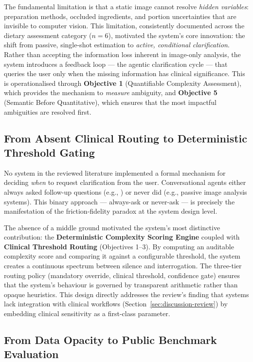 The fundamental limitation is that a static image cannot resolve \emph{hidden variables}: preparation methods, occluded ingredients, and portion uncertainties that are invisible to computer vision. This limitation, consistently documented across the dietary assessment category ($n=6$), motivated the system's core innovation: the shift from passive, single-shot estimation to \emph{active, conditional clarification}. Rather than accepting the information loss inherent in image-only analysis, the system introduces a feedback loop --- the agentic clarification cycle --- that queries the user only when the missing information has clinical significance. This is operationalised through \textbf{Objective 1} (Quantifiable Complexity Assessment), which provides the mechanism to \emph{measure} ambiguity, and \textbf{Objective 5} (Semantic Before Quantitative), which ensures that the most impactful ambiguities are resolved first.

\subsection{From Absent Clinical Routing to Deterministic Threshold Gating}

No system in the reviewed literature implemented a formal mechanism for deciding \emph{when} to request clarification from the user. Conversational agents either always asked follow-up questions (e.g., \citep{balsaUsabilityIntelligentVirtual2020,grecoEmotionalFeaturesInteractions2021}) or never did (e.g., passive image analysis systems). This binary approach --- always-ask or never-ask --- is precisely the manifestation of the friction-fidelity paradox at the system design level.

The absence of a middle ground motivated the system's most distinctive contribution: the \textbf{Deterministic Complexity Scoring Engine} coupled with \textbf{Clinical Threshold Routing} (Objectives 1--3). By computing an auditable complexity score and comparing it against a configurable threshold, the system creates a continuous spectrum between silence and interrogation. The three-tier routing policy (mandatory override, clinical threshold, confidence gate) ensures that the system's behaviour is governed by transparent arithmetic rather than opaque heuristics. This design directly addresses the review's finding that systems lack integration with clinical workflows (Section~\ref{sec:discussion-review}) by embedding clinical sensitivity as a first-class parameter.

\subsection{From Data Opacity to Public Benchmark Evaluation}

